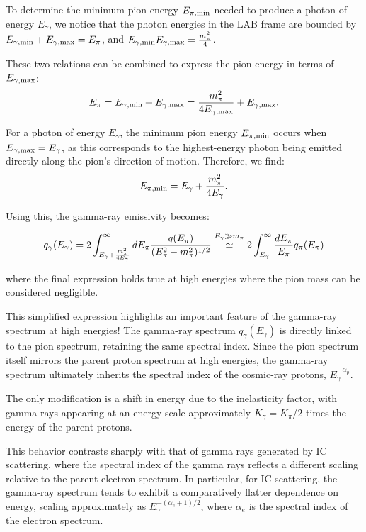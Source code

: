 To determine the minimum pion energy \(E_{\pi, \rm min}\) needed to produce a photon of energy \(E_\gamma\), we notice that the photon energies in the LAB frame are bounded by \( E_{\gamma, \rm min} + E_{\gamma, \rm max} = E_\pi \), and \( E_{\gamma, \rm min} E_{\gamma, \rm max} = \frac{m_\pi^2}{4} \).

These two relations can be combined to express the pion energy in terms of \(E_{\gamma, \rm max}\):
\begin{equation}
E_\pi = E_{\gamma, \rm min} + E_{\gamma, \rm max} = \frac{m_\pi^2}{4 E_{\gamma, \rm max}} + E_{\gamma, \rm max}.
\end{equation}

For a photon of energy \(E_\gamma\), the minimum pion energy \(E_{\pi, \rm min}\) occurs when \(E_{\gamma, \rm max} = E_\gamma\), as this corresponds to the highest-energy photon being emitted directly along the pion’s direction of motion. Therefore, we find:
%
\begin{equation}
E_{\pi, \rm min} = E_\gamma + \frac{m_\pi^2}{4 E_\gamma}.
\end{equation}

Using this, the gamma-ray emissivity becomes:
%
\begin{remark}
\begin{equation}\label{eq:qgamma2}
q_\gamma(E_\gamma) = 2 \int_{E_\gamma + \frac{m_\pi^2}{4 E_\gamma}}^\infty dE_\pi \frac{q(E_\pi)}{(E_\pi^2 - m_\pi^2)^{1/2}} \oset{E_\gamma \gg m_\pi}{\simeq} 2 \int_{E_\gamma}^\infty \frac{dE_\pi}{E_\pi} q_\pi(E_\pi)
\end{equation}
\end{remark}
%
where the final expression holds true at high energies where the pion mass can be considered negligible.

This simplified expression highlights an important feature of the gamma-ray spectrum at high energies! The gamma-ray spectrum \( q_\gamma(E_\gamma) \) is directly linked to the pion spectrum, retaining the same spectral index.
Since the pion spectrum itself mirrors the parent proton spectrum at high energies, the gamma-ray spectrum ultimately inherits the spectral index of the cosmic-ray protons, \( E_\gamma^{-\alpha_p} \).

The only modification is a shift in energy due to the inelasticity factor, with gamma rays appearing at an energy scale approximately \( K_\gamma = K_\pi / 2 \) times the energy of the parent protons.

This behavior contrasts sharply with that of gamma rays generated by IC scattering, where the spectral index of the gamma rays reflects a different scaling relative to the parent electron spectrum. In particular, for IC scattering, the gamma-ray spectrum tends to exhibit a comparatively flatter dependence on energy, scaling approximately as \(E_\gamma^{-(\alpha_e+1)/2}\), where \(\alpha_e\) is the spectral index of the electron spectrum.  

